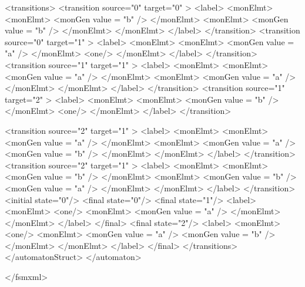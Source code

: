 \newpage 

{\footnotesize 
\begin{listingcont}
    <transitions>
      <transition  source="0"  target="0" >
	<label>
	  <monElmt>
	    <monElmt>
	      <monGen  value = "b" />
	    </monElmt>
	    <monElmt>
	      <monGen  value = "b" />
	    </monElmt>
	  </monElmt>
        </label>
      </transition>
      <transition  source="0"  target="1" >
        <label>
	  <monElmt>
	    <monElmt>
	      <monGen  value = "a" />
	    </monElmt>
	    <one/>
	  </monElmt>
        </label>
      </transition>
      <transition  source="1"  target="1" >
        <label>
	  <monElmt>
	    <monElmt>
	      <monGen  value = "a" />
	    </monElmt>
	    <monElmt>
	      <monGen  value = "a" />
	    </monElmt>
	  </monElmt>
        </label>
      </transition>
      <transition  source="1"  target="2" >
        <label>
	  <monElmt>
	    <monElmt>
	      <monGen  value = "b" />
	    </monElmt>
	    <one/>
	  </monElmt>
        </label>
      </transition>
\end{listingcont}
}

\newpage 
\enlargethispage*{2ex}
{\footnotesize 
\begin{listingcont}
      <transition  source="2"  target="1" >
        <label>
	  <monElmt>
	    <monElmt>
	      <monGen  value = "a" />
	    </monElmt>
	    <monElmt>
	      <monGen  value = "a" />
	      <monGen  value = "b" />
	    </monElmt>
	  </monElmt>
        </label>
      </transition>
      <transition  source="2"  target="1" >
        <label>
	  <monElmt>
	    <monElmt>
	      <monGen  value = "b" />
	    </monElmt>
	    <monElmt>
	      <monGen  value = "b" />
	      <monGen  value = "a" />
	    </monElmt>
	  </monElmt>
        </label>
      </transition>
      <initial state="0"/>
      <final   state="0"/>
      <final   state="1"/>
        <label>
	  <monElmt>
	    <one/>
	    <monElmt>
	      <monGen  value = "a" />
	    </monElmt>
	  </monElmt>
        </label>
      </final>
      <final   state="2"/>
        <label>
	  <monElmt>
	    <one/>
	    <monElmt>
	      <monGen  value = "a" />
	      <monGen  value = "b" />
	    </monElmt>
	  </monElmt>
        </label>
      </final>
    </transitions>
  </automatonStruct>
</automaton>

</fsmxml>
\end{listingcont}
}

\clearpage
